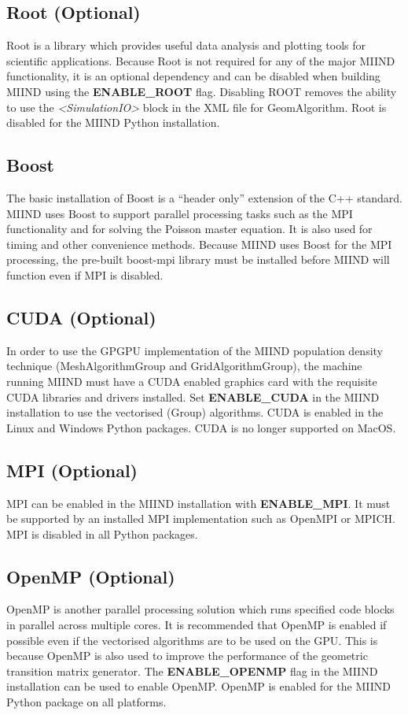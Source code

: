 \documentclass[utf8]{frontiers_suppmat} %
\begin{document}
\subsection*{Root (Optional)}
Root \citep{brun1997root} is a library which provides useful data analysis and plotting tools for scientific applications. Because Root is not required for any of the major MIIND functionality, it is an optional dependency and can be disabled when building MIIND using the \textbf{ENABLE\_ROOT} flag. Disabling ROOT removes the ability to use the \textit{\textless SimulationIO\textgreater} block in the XML file for GeomAlgorithm. Root is disabled for the MIIND Python installation. 

\subsection*{Boost}
The basic installation of Boost is a ``header only'' extension of the C++ standard. MIIND uses Boost to support parallel processing tasks such as the MPI functionality and for solving the Poisson master equation. It is also used for timing and other convenience methods. Because MIIND uses Boost for the MPI processing, the pre-built boost-mpi library must be installed before MIIND will function even if MPI is disabled. 

\subsection*{CUDA (Optional)}
In order to use the GPGPU implementation of the MIIND population density technique (MeshAlgorithmGroup and GridAlgorithmGroup), the machine running MIIND must have a CUDA enabled graphics card with the requisite CUDA libraries and drivers installed. Set \textbf{ENABLE\_CUDA} in the MIIND installation to use the vectorised (Group) algorithms. CUDA is enabled in the Linux and Windows Python packages. CUDA is no longer supported on MacOS.

\subsection*{MPI (Optional)}
MPI can be enabled in the MIIND installation with \textbf{ENABLE\_MPI}. It must be supported by an installed MPI implementation such as OpenMPI or MPICH. MPI is disabled in all Python packages.

\subsection*{OpenMP (Optional)}
OpenMP is another parallel processing solution which runs specified code blocks in parallel across multiple cores. It is recommended that OpenMP is enabled if possible even if the vectorised algorithms are to be used on the GPU. This is because OpenMP is also used to improve the performance of the geometric transition matrix generator. The \textbf{ENABLE\_OPENMP} flag in the MIIND installation can be used to enable OpenMP. OpenMP is enabled for the MIIND Python package on all platforms.
\end{document}
